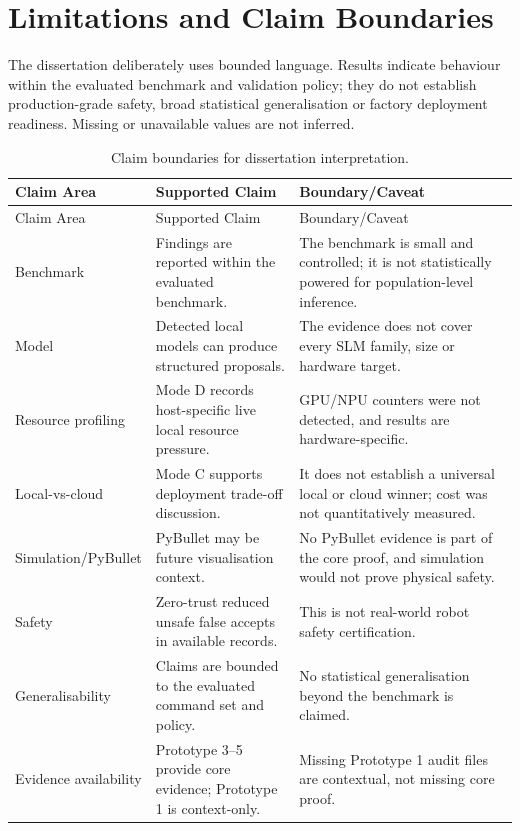 \section{Limitations and Claim Boundaries}
\label{sec:limitations_claim_boundaries}

The dissertation deliberately uses bounded language. Results indicate behaviour within the evaluated benchmark and validation policy; they do not establish production-grade safety, broad statistical generalisation or factory deployment readiness. Missing or unavailable values are not inferred.

\begin{longtable}{p{}p{}p{}}
        \caption{Claim boundaries for dissertation interpretation.}
        \label{tab:claim_boundaries}\\
        \toprule
        Claim Area & Supported Claim & Boundary/Caveat \\
        \midrule
        \endfirsthead
        \toprule
        Claim Area & Supported Claim & Boundary/Caveat \\
        \midrule
        \endhead
        Benchmark & Findings are reported within the evaluated benchmark. & The benchmark is small and controlled; it is not statistically powered for population-level inference. \\
Model & Detected local models can produce structured proposals. & The evidence does not cover every SLM family, size or hardware target. \\
Resource profiling & Mode D records host-specific live local resource pressure. & GPU/NPU counters were not detected, and results are hardware-specific. \\
Local-vs-cloud & Mode C supports deployment trade-off discussion. & It does not establish a universal local or cloud winner; cost was not quantitatively measured. \\
Simulation/PyBullet & PyBullet may be future visualisation context. & No PyBullet evidence is part of the core proof, and simulation would not prove physical safety. \\
Safety & Zero-trust reduced unsafe false accepts in available records. & This is not real-world robot safety certification. \\
Generalisability & Claims are bounded to the evaluated command set and policy. & No statistical generalisation beyond the benchmark is claimed. \\
Evidence availability & Prototype 3--5 provide core evidence; Prototype 1 is context-only. & Missing Prototype 1 audit files are contextual, not missing core proof. \\
        \bottomrule
        \end{longtable}
